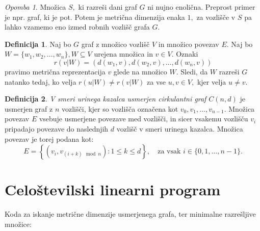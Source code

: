 \documentclass[a4paper,12pt]{article}
\theoremstyle{definition}
\newtheorem{definicija}{Definicija}[section]
\theoremstyle{remark}
\newtheorem*{opomba}{Opomba}
\theoremstyle{definition}
\begin{document}
\begin{opomba}
    Množica $S,$ ki razreši dani graf $G$ ni nujno enolična. Preprost primer je npr. graf, ki je pot. Potem je 
    metrična dimenzija enaka $1,$ za vozlišče v $S$ pa lahko vzamemo eno izmed robnih vozlišč grafa $G.$
    \\
\end{opomba}

\begin{definicija}
    Naj bo $G$ graf z množico vozlišč $V$ in množico povezav $E.$
    Naj bo $W = \{w_1, w_2, \dots ,w_n \},  W \subseteq V$ urejena množica in $v \in V.$
    Oznaki $$r(v|W) = (d (w_1,v), d(w_2,v), \dots ,d(w_n,v))$$ pravimo metrična 
    reprezentacija $v$ glede na množico $W.$ Sledi, da $W$ razreši $G$ natanko tedaj, ko velja 
    $r(u|W) \neq r(v|W)$ za vse $u,v \in V,$ kjer velja $u \neq v.$
    \\
\end{definicija}


\begin{definicija}
    \textit{V smeri urinega kazalca usmerjen cirkulantni graf \( C(n, d) \) }je usmerjen graf z \( n \) vozlišči, kjer so vozlišča označena kot 
    \( v_0, v_1, \dots, v_{n-1} \). Množica povezav \( E \) vsebuje usmerjene povezave med vozlišči, in sicer vsakemu vozlišču \( v_i \) pripadajo povezave do naslednjih \( d \) vozlišč v smeri urinega kazalca. 
    Množica povezav je torej podana kot:
    \[
    E = \left\{ (v_i, v_{(i+k) \mod n}) : 1 \leq k \leq d \right\}, \quad \text{za vsak } i \in \{0, 1, \dots, n-1\}.
    \]
\end{definicija}

\section*{Celoštevilski linearni program}

Koda za iskanje metrične dimenzije usmerjenega grafa, ter minimalne razrešljive množice:
\end{document}
